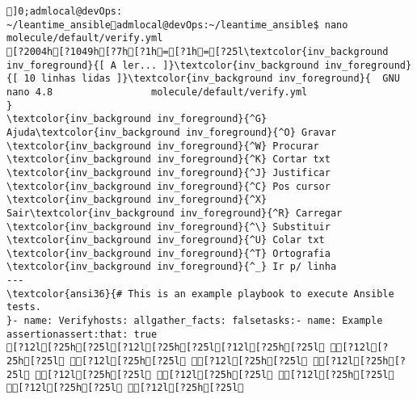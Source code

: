 \documentclass{scrartcl}
\title{}
\begin{document}
\begin{Verbatim}
]0;admlocal@devOps: ~/leantime_ansibleadmlocal@devOps:~/leantime_ansible$ nano molecule/default/verify.yml 
[?2004h[?1049h[?7h[?1h=[?1h=[?25l\textcolor{inv_background inv_foreground}{[ A ler... ]}\textcolor{inv_background inv_foreground}{[ 10 linhas lidas ]}\textcolor{inv_background inv_foreground}{  GNU nano 4.8                 molecule/default/verify.yml                             }
\textcolor{inv_background inv_foreground}{^G} Ajuda\textcolor{inv_background inv_foreground}{^O} Gravar     \textcolor{inv_background inv_foreground}{^W} Procurar   \textcolor{inv_background inv_foreground}{^K} Cortar txt \textcolor{inv_background inv_foreground}{^J} Justificar \textcolor{inv_background inv_foreground}{^C} Pos cursor
\textcolor{inv_background inv_foreground}{^X} Sair\textcolor{inv_background inv_foreground}{^R} Carregar   \textcolor{inv_background inv_foreground}{^\} Substituir \textcolor{inv_background inv_foreground}{^U} Colar txt  \textcolor{inv_background inv_foreground}{^T} Ortografia \textcolor{inv_background inv_foreground}{^_} Ir p/ linha
---
\textcolor{ansi36}{# This is an example playbook to execute Ansible tests.
}- name: Verifyhosts: allgather_facts: falsetasks:- name: Example assertionassert:that: true
[?12l[?25h[?25l[?12l[?25h[?25l[?12l[?25h[?25l [?12l[?25h[?25l [?12l[?25h[?25l [?12l[?25h[?25l [?12l[?25h[?25l [?12l[?25h[?25l [?12l[?25h[?25l [?12l[?25h[?25l [?12l[?25h[?25l [?12l[?25h[?25l 

\end{Verbatim}
\end{document}
